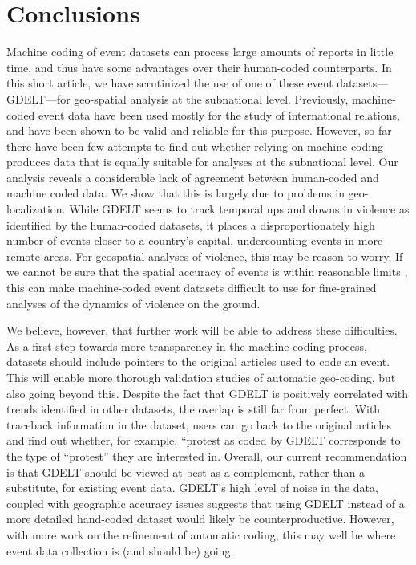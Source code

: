 \documentclass[hidelinks]{article}
\begin{document}
\section*{Conclusions}

Machine coding of event datasets can process large amounts of reports in little time, and thus have some advantages over their human-coded counterparts. In this short article, we have scrutinized the use of one of these event datasets---GDELT---for geo-spatial analysis at the subnational level. Previously, machine-coded event data have been used mostly for the study of international relations, and have been shown to be valid and reliable for this purpose. However, so far there have been few attempts to find out whether relying on machine coding produces data that is equally suitable for analyses at the subnational level. Our analysis reveals a considerable lack of agreement between human-coded and machine coded data. We show that this is largely due to problems in geo-localization. While GDELT seems to track temporal ups and downs in violence as identified by the human-coded datasets, it places a disproportionately high number of events closer to a country's capital, undercounting events in more remote areas. For geospatial analyses of violence, this may be reason to worry. If we cannot be sure that the spatial accuracy of events is within reasonable limits \citep{weidmann15accuracy}, this can make machine-coded event datasets difficult to use for fine-grained analyses of the dynamics of violence on the ground. 

We believe, however, that further work will be able to address these difficulties. As a first step towards more transparency in the machine coding process, datasets should include pointers to the original articles used to code an event. This will enable more thorough validation studies of automatic geo-coding, but also going beyond this. Despite the fact that GDELT is positively correlated with trends identified in other datasets, the overlap is still far from perfect. With traceback information in the dataset, users can go back to the original articles and find out whether, for example, ``protest as coded by GDELT corresponds to the type of ``protest'' they are interested in. Overall, our current recommendation is that GDELT should be viewed at best as a complement, rather than a substitute, for existing event data. GDELT's high level of noise in the data, coupled with geographic accuracy issues suggests that using GDELT instead of a more detailed hand-coded dataset would likely be counterproductive. However, with more work on the refinement of automatic coding, this may well be where event data collection is (and should be) going.

\printbibliography
%
%
\end{document}

